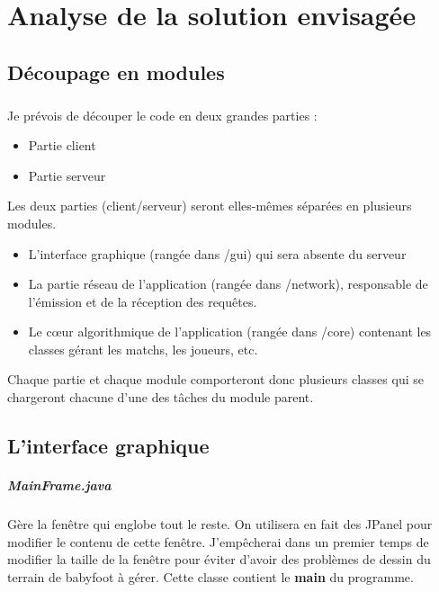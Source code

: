 \documentclass[a4paper,12pt]{report}
\begin{document}
\chapter{Analyse de la solution envisagée}


\section{Découpage en modules}
\paragraph{}
Je prévois de découper le code en deux grandes parties :
\begin{itemize}
    \item Partie client
    \item Partie serveur
\end{itemize}
Les deux parties (client/serveur) seront elles-mêmes séparées en plusieurs modules.
\begin{itemize}
    \item L'interface graphique (rangée dans /gui) qui sera absente du serveur
    \item La partie réseau de l'application (rangée dans /network), responsable de l'émission et de la réception des requêtes.
    \item Le c\oe{}ur algorithmique de l'application (rangée dans /core) contenant les classes gérant les matchs, les joueurs, etc.
\end{itemize}
Chaque partie et chaque module comporteront donc plusieurs classes qui se chargeront chacune d'une des tâches du module parent.


\section{L'interface graphique}
\paragraph{MainFrame.java}
Gère la fenêtre qui englobe tout le reste. On utilisera en fait des JPanel pour modifier le contenu de cette fenêtre. J'empêcherai dans un premier temps de modifier la taille de la fenêtre pour éviter d'avoir des problèmes de dessin du terrain de babyfoot à gérer. Cette classe contient le \textbf{main} du programme.
\end{document}
